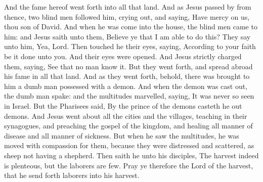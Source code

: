 And the fame hereof went forth into all that land.  And as Jesus passed by from thence, two blind men followed him, crying out, and saying, Have mercy on us, thou son of David. And when he was come into the house, the blind men came to him: and Jesus saith unto them, Believe ye that I am able to do this? They say unto him, Yea, Lord. Then touched he their eyes, saying, According to your faith be it done unto you. And their eyes were opened. And Jesus strictly charged them, saying, See that no man know it. But they went forth, and spread abroad his fame in all that land.  And as they went forth, behold, there was brought to him a dumb man possessed with a demon. And when the demon was cast out, the dumb man spake: and the multitudes marvelled, saying, It was never so seen in Israel. But the Pharisees said, By the prince of the demons casteth he out demons.  And Jesus went about all the cities and the villages, teaching in their synagogues, and preaching the gospel of the kingdom, and healing all manner of disease and all manner of sickness. But when he saw the multitudes, he was moved with compassion for them, because they were distressed and scattered, as sheep not having a shepherd. Then saith he unto his disciples, The harvest indeed is plenteous, but the laborers are few. Pray ye therefore the Lord of the harvest, that he send forth laborers into his harvest. 

